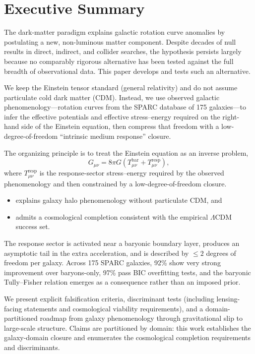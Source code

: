 \section*{Executive Summary}

The dark-matter paradigm explains galactic rotation curve anomalies by postulating a new, non-luminous matter component. Despite decades of null results in direct, indirect, and collider searches, the hypothesis persists largely because no comparably rigorous alternative has been tested against the full breadth of observational data. This paper develops and tests such an alternative.

We keep the Einstein tensor standard (general relativity) and do not assume particulate cold dark matter (CDM). Instead, we use observed galactic phenomenology---rotation curves from the SPARC database of 175 galaxies---to infer the effective potentials and effective stress--energy required on the right-hand side of the Einstein equation, then compress that freedom with a low-degree-of-freedom ``intrinsic medium response'' closure.

The organizing principle is to treat the Einstein equation as an inverse problem,
\begin{equation}
G_{\mu\nu} = 8\pi G\left(T^{\mathrm{bar}}_{\mu\nu} + T^{\mathrm{resp}}_{\mu\nu}\right),
\end{equation}
where $T^{\mathrm{resp}}_{\mu\nu}$ is the response-sector stress--energy required by the observed phenomenology and then constrained by a low-degree-of-freedom closure.

\begin{itemize}
\item explains galaxy halo phenomenology without particulate CDM, and
\item admits a cosmological completion consistent with the empirical $\Lambda$CDM success set.
\end{itemize}

The response sector is activated near a baryonic boundary layer, produces an asymptotic tail in the extra acceleration, and is described by $\le 2$ degrees of freedom per galaxy. Across 175 SPARC galaxies, 92\% show very strong improvement over baryons-only, 97\% pass BIC overfitting tests, and the baryonic Tully--Fisher relation emerges as a consequence rather than an imposed prior.

We present explicit falsification criteria, discriminant tests (including lensing-facing statements and cosmological viability requirements), and a domain-partitioned roadmap from galaxy phenomenology through gravitational slip to large-scale structure. Claims are partitioned by domain: this work establishes the galaxy-domain closure and enumerates the cosmological completion requirements and discriminants.
